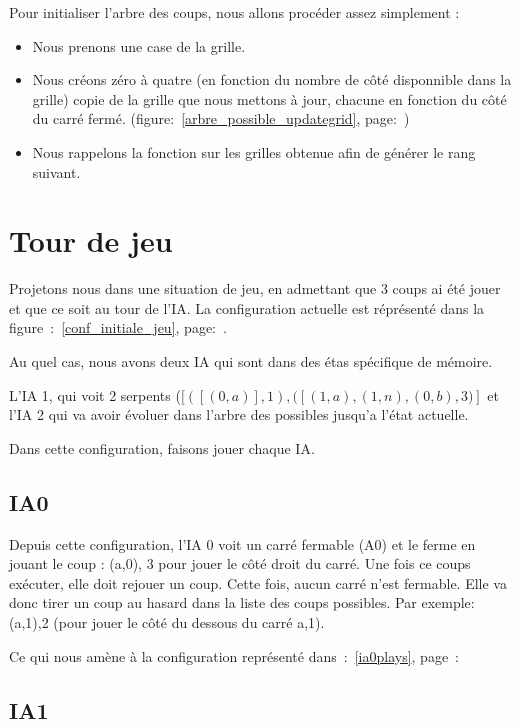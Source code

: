 \documentclass[a4paper,12pt]{report}
\begin{document}
Pour initialiser l'arbre des coups, nous allons proc\'eder assez simplement :
\begin{itemize}
 \item Nous prenons une case de la grille.
 \item Nous cr\'eons z\'ero \`a quatre (en fonction du nombre de c\^ot\'e disponnible dans la grille) \og{}copie\fg{} de la grille que nous mettons \`a jour, chacune en fonction du c\^ot\'e du carr\'e ferm\'e. (figure:~\autoref{arbre_possible_updategrid}, page:~\pageref{arbre_possible_updategrid})
 \item Nous rappelons la fonction sur les grilles obtenue afin de g\'en\'erer le rang suivant. 
\end{itemize}

\chapter{Tour de jeu}

Projetons nous dans une situation de jeu, en admettant que 3 coups ai \'et\'e jouer et que ce soit au tour de l'IA. La configuration actuelle est r\'epr\'esent\'e dans la figure~:~\autoref{conf_initiale_jeu}, page:~\pageref{conf_initiale_jeu}.

Au quel cas, nous avons deux IA qui sont dans des \'etas sp\'ecifique de m\'emoire. 

L'IA 1, qui voit 2 serpents ($[([(0,a)],1),([(1,a),(1,n),(0,b), 3)]$ et l'IA 2 qui va avoir \'evoluer dans l'arbre des possibles jusqu'a l'\'etat actuelle. 

Dans cette configuration, faisons jouer chaque IA. 

\section{IA0}

Depuis cette configuration, l'IA 0 voit un carr\'e fermable (A0) et le ferme en jouant le coup : (a,0), 3 pour jouer le c\^ot\'e droit du carr\'e. Une fois ce coups ex\'ecuter, elle doit rejouer un coup. Cette fois, aucun carr\'e n'est fermable. Elle va donc tirer un coup au hasard dans la liste des coups possibles. Par exemple: (a,1),2 (pour jouer le c\^ot\'e du dessous du carr\'e a,1).

Ce qui nous am\`ene \`a la configuration repr\'esent\'e dans~:~\autoref{ia0plays}, page~:~\pageref{ia0plays}

\section{IA1}
\end{document}
